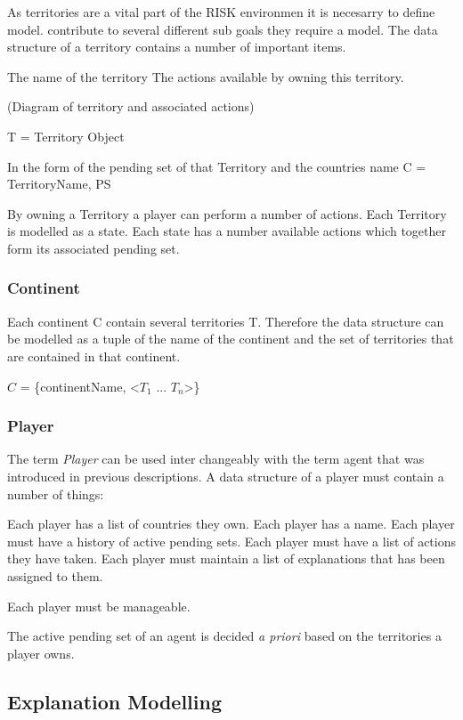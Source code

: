 \documentclass[parskip]{cs4rep}
\begin{document}
As territories are a vital part of the RISK environmen it is necesarry to define  model. contribute to several different sub goals they require a model. The data structure of a territory contains a number of important items.

The name of the territory
The actions available by owning this territory.

(Diagram of territory and associated actions)

T = Territory Object

In the form of the pending set of that Territory and the countries name C = { TerritoryName, PS }

By owning a Territory a player can perform a number of actions.
Each Territory is modelled as a state. Each state has a number available actions which together form its associated pending set.

\subsubsection{Continent}

Each continent C contain several territories T. Therefore the data structure can be modelled as a tuple of the name of the continent and the set of territories that are contained in that continent.

$C$ = \{continentName, <$T_{1}$ ... $T_{n}$>\}

\subsubsection{Player}

The term \textit{Player} can be used inter changeably with the term agent that was introduced in previous descriptions. A data structure of a player must contain a number of things:

Each player has a list of countries they own.
Each player has a name.
Each player must have a history of active pending sets.
Each player must have a list of actions they have taken.
Each player must maintain a list of explanations that has been assigned to them.

Each player must be manageable.

The active pending set of an agent is decided \textit{a priori} based on the territories a player owns.

\subsection{Explanation Modelling}
\end{document}
